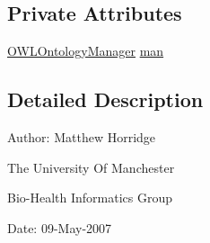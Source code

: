 \subsection*{Private Attributes}
\begin{DoxyCompactItemize}
\item 
\hyperlink{interfaceorg_1_1semanticweb_1_1owlapi_1_1model_1_1_o_w_l_ontology_manager}{O\-W\-L\-Ontology\-Manager} \hyperlink{classorg_1_1semanticweb_1_1owlapi_1_1api_1_1test_1_1syntax_1_1rdf_1_1_abstract_renderer_and_parser_a1e25e70e57037eb5b77b3053a8ead969}{man}
\end{DoxyCompactItemize}


\subsection{Detailed Description}
Author\-: Matthew Horridge\par
 The University Of Manchester\par
 Bio-\/\-Health Informatics Group\par
 Date\-: 09-\/\-May-\/2007\par
 \par
 

